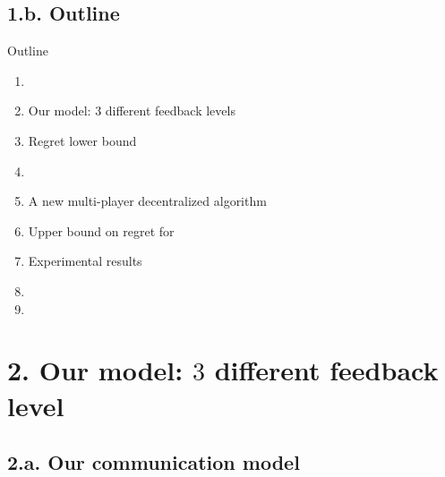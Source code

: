 \documentclass[12pt,english,ignorenonframetext,aspectratio=169,]{beamer}
\providecommand{\tightlist}{%
  \setlength{\itemsep}{0pt}\setlength{\parskip}{0pt}}
\begin{document}
\subsection{\hfill{}1.b. Outline\hfill{}}

\begin{frame}{Outline}

\vspace*{-15pt}

\begin{enumerate}
\def\labelenumi{\arabic{enumi}.}
\tightlist
\item
\item
  Our model: \(3\) different feedback levels
\item
  Regret lower bound
\item
\item
  A new multi-player decentralized algorithm
\item
  Upper bound on regret for \MCTopM
\item
  Experimental results
\item
\item
\end{enumerate}

\end{frame}



\section{\hfill{}2. Our model: $3$ different feedback level\hfill{}}

\subsection{\hfill{}2.a. Our communication model\hfill{}}
\end{document}
